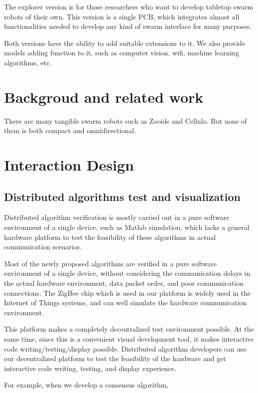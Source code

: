 \documentclass[sigconf]{acmart}
\begin{document}
The explorer version is for those researchers who want to develop tabletop swarm robots of their own. This version is a single PCB, which integrates almost all functionalities needed to develop any kind of swarm interface for many purposes.

Both versions have the ability to add suitable extensions to it. We also provide models adding function to it, such as computer vision, wifi, machine learning algorithms, etc.

\section{Backgroud and related work}

There are many tangible swarm robots such as Zooids\cite{le2016zooids} and Cellulo\cite{ozgur2017cellulo}. But none of them is both compact and omnidirectional.

\section{Interaction Design}

\subsection{Distributed algorithms test and visualization}

Distributed algorithm verification is mostly carried out in a pure software environment of a single device, such as Matlab simulation, which lacks a general hardware platform to test the feasibility of these algorithms in actual communication scenarios.

Most of the newly proposed algorithms are verified in a pure software environment of a single device, without considering the communication delays in the actual hardware environment, data packet order, and poor communication connections. The ZigBee chip which is used in our platform is widely used in the Internet of Things systems, and can well simulate the hardware communication environment.

This platform makes a completely decentralized test environment possible. At the same time, since this is a convenient visual development tool, it makes interactive code writing/testing/display possible. Distributed algorithm developers can use our decentralized platform to test the feasibility of the hardware and get interactive code writing, testing, and display experience.

For example, when we develop a consensus algorithm, 
\end{document}
